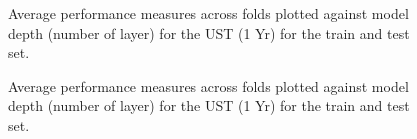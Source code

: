 \documentclass{article}
\theoremstyle{plain}
\theoremstyle{definition}
\theoremstyle{remark}
\begin{document}
\begin{figure}


\caption{\label{fig-ust-1y}Average performance measures across folds plotted against model depth (number of layer) for the UST (1 Yr) for the train and test set.}

\end{figure}%


\begin{figure}


\caption{\label{fig-ust-10}Average performance measures across folds plotted against model depth (number of layer) for the UST (1 Yr) for the train and test set.}

\end{figure}%

\end{document}
